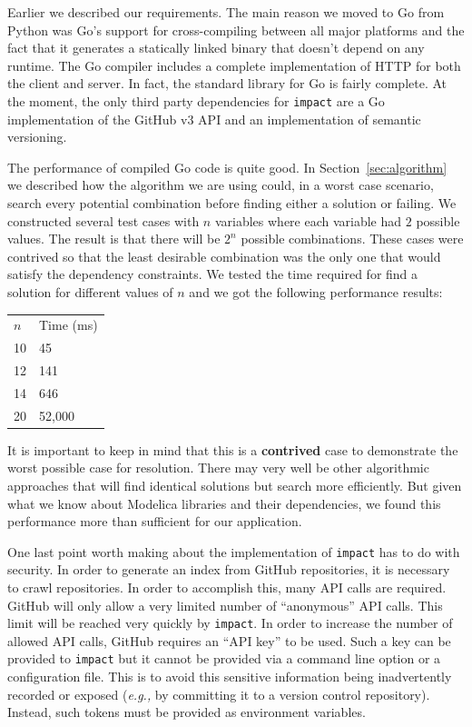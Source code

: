 \documentclass[11pt,a4paper,twocolumn]{article}
\newcommand{\code}[1]{\texttt{#1}} %
\begin{document}
Earlier we described our requirements.  The main reason we moved to Go
from Python was Go's support for cross-compiling between all major
platforms and the fact that it generates a statically linked binary
that doesn't depend on any runtime.  The Go compiler includes a
complete implementation of HTTP for both the client and server.  In
fact, the standard library for Go is fairly complete.  At the moment,
the only third party dependencies for \code{impact} are a Go
implementation of the GitHub v3 API and an implementation of semantic
versioning.

The performance of compiled Go code is quite good.  In
Section~\ref{sec:algorithm} we described how the algorithm we are using could,
in a worst case scenario, search every potential combination before
finding either a solution or failing.  We constructed several test
cases with $n$ variables where each variable had $2$ possible values.
The result is that there will be $2^n$ possible combinations.  These
cases were contrived so that the least desirable combination was the
only one that would satisfy the dependency constraints.  We tested the
time required for find a solution for different values of $n$ and we
got the following performance results:

\begin{center}
\begin{tabular}{ll}
$n$ & Time (ms) \\
10 & 45 \\
12 & 141 \\
14 & 646 \\
20 & 52,000 \\
\end{tabular}
\end{center}

It is important to keep in mind that this is a \textbf{contrived} case
to demonstrate the worst possible case for resolution.  There may very
well be other algorithmic approaches that will find identical
solutions but search more efficiently.  But given what we know about
Modelica libraries and their dependencies, we found this performance
more than sufficient for our application.

One last point worth making about the implementation of \code{impact}
has to do with security.  In order to generate an index from GitHub
repositories, it is necessary to crawl repositories.  In order to
accomplish this, many API calls are required.  GitHub will only allow
a very limited number of ``anonymous'' API calls.  This limit will be
reached very quickly by \code{impact}.  In order to increase the
number of allowed API calls, GitHub requires an ``API key'' to be
used.  Such a key can be provided to \code{impact} but it cannot be
provided via a command line option or a configuration file.  This is
to avoid this sensitive information being inadvertently recorded or
exposed (\emph{e.g.,} by committing it to a version control
repository).  Instead, such tokens must be provided as environment
variables.
\end{document}
